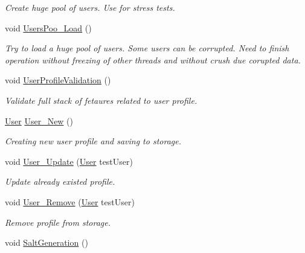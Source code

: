 \begin{DoxyCompactItemize}
\begin{DoxyCompactList}\small\item\em Create huge pool of users. Use for stress tests. \end{DoxyCompactList}\item 
void \mbox{\hyperlink{class_a_c_tests_1_1_tests_1_1_data_af64fbea59748f51cde98b4880717ae98}{Users\+Poo\+\_\+\+Load}} ()
\begin{DoxyCompactList}\small\item\em Try to load a huge pool of users. Some users can be corrupted. Need to finish operation without freezing of other threads and without crush due corupted data. \end{DoxyCompactList}\item 
void \mbox{\hyperlink{class_a_c_tests_1_1_tests_1_1_data_ab71c64448d6988fb560e3186f112f25e}{User\+Profile\+Validation}} ()
\begin{DoxyCompactList}\small\item\em Validate full stack of fetaures related to user profile. \end{DoxyCompactList}\item 
\mbox{\hyperlink{class_authority_controller_1_1_data_1_1_personal_1_1_user}{User}} \mbox{\hyperlink{class_a_c_tests_1_1_tests_1_1_data_ae942667cbb7e7cb423b9ddca2d471b7d}{User\+\_\+\+New}} ()
\begin{DoxyCompactList}\small\item\em Creating new user profile and saving to storage. \end{DoxyCompactList}\item 
void \mbox{\hyperlink{class_a_c_tests_1_1_tests_1_1_data_a0412f98e50984ac558935722f4b2c69e}{User\+\_\+\+Update}} (\mbox{\hyperlink{class_authority_controller_1_1_data_1_1_personal_1_1_user}{User}} test\+User)
\begin{DoxyCompactList}\small\item\em Update already existed profile. \end{DoxyCompactList}\item 
void \mbox{\hyperlink{class_a_c_tests_1_1_tests_1_1_data_a75fb52351037b0ec4d3ecb13dce062ed}{User\+\_\+\+Remove}} (\mbox{\hyperlink{class_authority_controller_1_1_data_1_1_personal_1_1_user}{User}} test\+User)
\begin{DoxyCompactList}\small\item\em Remove profile from storage. \end{DoxyCompactList}\item 
void \mbox{\hyperlink{class_a_c_tests_1_1_tests_1_1_data_a43cb9406abb4801fded880d31ef04725}{Salt\+Generation}} ()

\end{DoxyCompactItemize}
